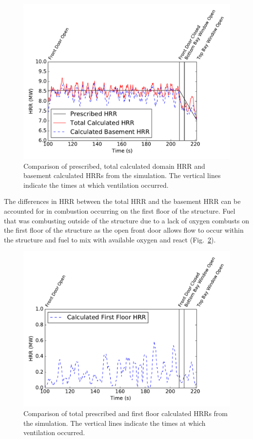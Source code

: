 \documentclass[12pt,oneside]{book}
\begin{document}
\begin{figure}[!ht]
\includegraphics[width=5in]{../Figures/PG_Basement_9MW_HRR}
\caption[Prescribed, calculated domain, and calculated basement HRRs vs. time from the simulation.]
{Comparison of prescribed, total calculated domain HRR and basement calculated HRRs from the simulation. The vertical lines indicate the times at which ventilation occurred.}
\label{fig:PG_Basement_9MW_HRR}
\end{figure}

The differences in HRR between the total HRR and the basement HRR can be accounted for in combustion occurring on the first floor of the structure. Fuel that was combusting outside of the structure due to a lack of oxygen combusts on the first floor of the structure as the open front door allows flow to occur within the structure and fuel to mix with available oxygen and react (Fig.~\ref{fig:PG_First_9MW_HRR}).

\begin{figure}[!ht]
\includegraphics[width=5in]{../Figures/PG_First_9MW_HRR}
\caption[Prescribed and first floor calculated HRR vs. time from the simulation.]
{Comparison of total prescribed and first floor calculated HRRs from the simulation. The vertical lines indicate the times at which ventilation occurred.}
\label{fig:PG_First_9MW_HRR}
\end{figure}
\end{document}
